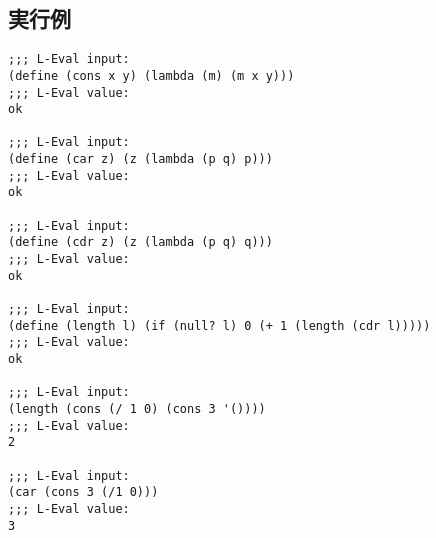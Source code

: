 \documentclass[a4paper,12pt]{article}
\begin{document}
\subsection{実行例}
{\small
\begin{verbatim}
;;; L-Eval input:
(define (cons x y) (lambda (m) (m x y)))
;;; L-Eval value:
ok

;;; L-Eval input:
(define (car z) (z (lambda (p q) p)))
;;; L-Eval value:
ok

;;; L-Eval input:
(define (cdr z) (z (lambda (p q) q)))
;;; L-Eval value:
ok

;;; L-Eval input:
(define (length l) (if (null? l) 0 (+ 1 (length (cdr l)))))
;;; L-Eval value:
ok

;;; L-Eval input:
(length (cons (/ 1 0) (cons 3 '())))
;;; L-Eval value:
2

;;; L-Eval input:
(car (cons 3 (/1 0)))
;;; L-Eval value:
3

\end{verbatim}
}
\end{document}
